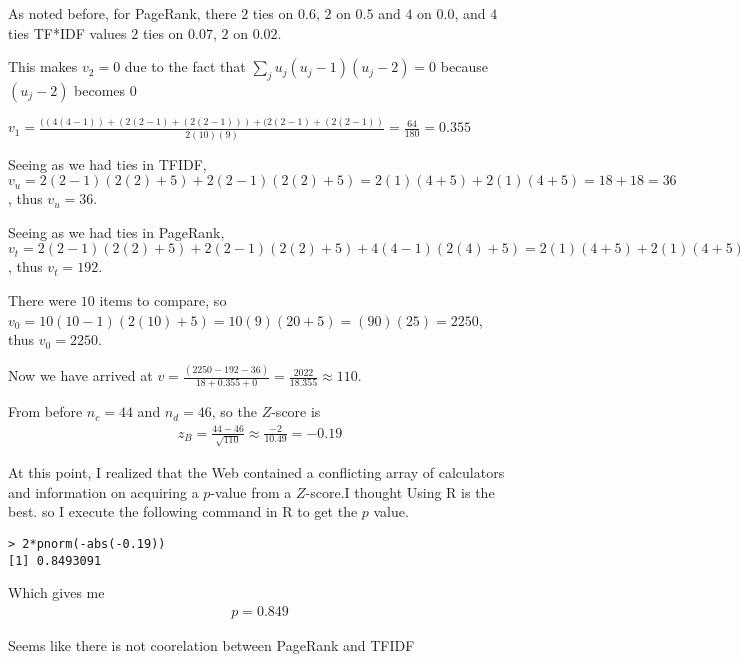 As noted before, for PageRank, there $2$ ties on $0.6$, $2$ on $0.5$ and $4$ on $0.0$, and $4$ ties TF*IDF values $2$ ties on $0.07$, $2$ on $0.02$.

This makes $v_2 = 0$ due to the fact that $\sum_j u_j(u_j - 1)(u_j - 2) = 0$ because $(u_j-2)$ becomes 0

$v_1= \frac{((4(4-1))+(2(2-1)+(2(2-1)))+(2(2-1)+(2(2-1))}{2(10)(9)}=\frac{64}{180}=0.355$ 

Seeing as we had ties in TFIDF, $v_u = 2(2 - 1)(2(2) + 5) + 2(2 - 1)(2(2) + 5) = 2(1)(4+5) + 2(1)(4 + 5) = 18 + 18 =  36$, thus $v_u = 36$.

Seeing as we had ties in PageRank, $v_t = 2(2 - 1)(2(2) + 5)+ 2(2 - 1)(2(2) + 5) + 4(4 - 1)(2(4) + 5) = 2(1)(4+5)+ 2(1)(4+5) + 6(5)(12 + 5) = 2(9) +  2(9)+ 12(13) = 18+ 18 + 156 = 192$, thus $v_t = 192$.

There were $10$ items to compare, so $v_0 = 10(10 - 1)(2(10) + 5) = 10(9)(20 + 5) = (90)(25) = 2250$, thus $v_0 = 2250$.

Now we have arrived at $v = \frac{(2250 - 192 - 36)}{18 + 0.355 + 0} = \frac{2022}{18.355} \approx 110$.

From before $n_c = 44$ and $n_d = 46$, so the $Z$-score is
\begin{align*}
z_B = \frac{44 - 46}{\sqrt{110}} \approx \frac{-2}{10.49} = -0.19
\end{align*}

At this point, I realized that the Web contained a conflicting array of calculators and information on acquiring a $p$-value from a $Z$-score.I thought Using R is the best. so I execute the following command in R to get the $p$ value.

\begin{lstlisting}[frame=single]
> 2*pnorm(-abs(-0.19))
[1] 0.8493091
\end{lstlisting}

Which gives me
\begin{align*}
p = 0.849
\end{align*}

Seems like there is not coorelation between PageRank and TFIDF

